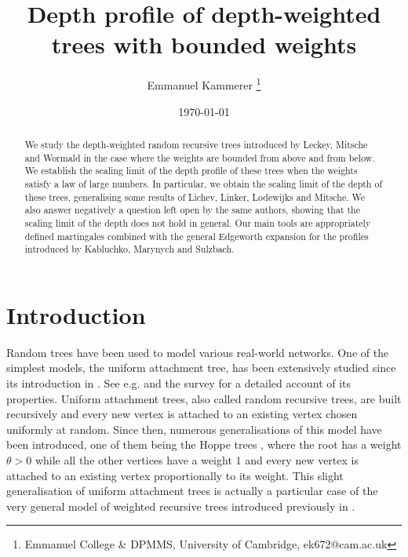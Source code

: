 \documentclass[11pt]{article}
\title{Depth profile of depth-weighted trees with bounded weights}
\author{Emmanuel Kammerer \thanks{Emmanuel College \& DPMMS, University of Cambridge, ek672@cam.ac.uk}
}
\date{\today}
\numberwithin{equation}{section}
\begin{document}
\maketitle

\begin{abstract}
 We study the depth-weighted random recursive trees introduced by Leckey, Mitsche and Wormald in the case where the weights are bounded from above and from below. We establish the scaling limit of the depth profile of these trees when the weights satisfy a law of large numbers. In particular, we obtain the scaling limit of the depth of these trees, generalising some results of Lichev, Linker, Lodewijks and Mitsche. We also answer negatively a question left open by the same authors, showing that the scaling limit of the depth does not hold in general. Our main tools are appropriately defined martingales combined with the general Edgeworth expansion for the profiles introduced by Kabluchko, Marynych and Sulzbach.
\end{abstract}



\section{Introduction}
Random trees have been used to model various real-world networks. One of the simplest models, the uniform attachment tree, has been extensively studied since its introduction in \cite{NR70}. See e.g.\@ \cite{Pit94} and the survey \cite{SM94} for a detailed account of its properties. Uniform attachment trees, also called random recursive trees, are built recursively and every new vertex is attached to an existing vertex chosen uniformly at random. Since then, numerous generalisations of this model have been introduced, one of them being the Hoppe trees \cite{LN13}, where the root has a weight $\theta>0$ while all the other vertices have a weight $1$ and every new vertex is attached to an existing vertex proportionally to its weight. This slight generalisation of uniform attachment trees is actually a particular case of the very general model of weighted recursive trees introduced previously in \cite{BV06}.
\end{document}
